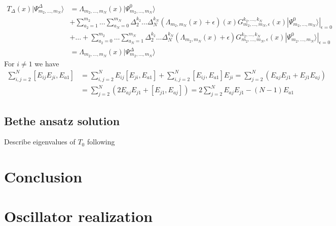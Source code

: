 \documentclass[11pt]{article}
\numberwithin{equation}{section}
\numberwithin{equation}{subsection}
\begin{document}
{\begin{align*}
T_{\Delta}(x)|\Psi_{m_{2},\ldots,m_{N}}^{\Delta}\rangle&=
		\Lambda_{m_{2},\ldots,m_{N}}(x)|\Psi_{m_{2},\ldots,m_{N}}^{0}\rangle
	\\&+
	\sum_{a_{2}=1}^{m_{2}}\ldots\sum_{a_{N}=0}^{m_{N}}\Delta_{2}^{k_{2}}\ldots \Delta_{N}^{k_{N}}\left(\Lambda_{m_{2},m_{N}}(x)+\epsilon\right)(x)G_{m_{2},\ldots,m_{N},\epsilon}^{k_{2},\ldots,k_{N}}(x)|\Psi_{m_{2},\ldots,m_{N}}^{0}\rangle|_{\epsilon=0}
	\\&+\ldots+	\sum_{a_{2}=0}^{m_{2}}\ldots\sum_{a_{N}=1}^{m_{N}}\Delta_{2}^{k_{2}}\ldots \Delta_{N}^{k_{N}}\left(\Lambda_{m_{2},m_{N}}(x)+\epsilon\right)G_{m_{2},\ldots,m_{N},\epsilon}^{k_{2},\ldots,k_{N}}(x)|\Psi_{m_{2},\ldots,m_{N}}^{0}\rangle|_{\epsilon=0}
	\\&=
	\Lambda_{m_{2},\ldots,m_{N}}(x)|\Psi_{m_{2},\ldots,m_{N}}^{\Delta}\rangle
\end{align*}
}
For $i\neq 1$ we have
\begin{equation}
\begin{split}
 \sum_{i,j=2}^N [E_{ij}E_{ji},E_{a1}]&=\sum_{i,j=2}^N E_{ij} [E_{ji},E_{a1}]+\sum_{i,j=2}^N  [E_{ij},E_{a1}]E_{ji}=\sum_{j=2}^N( E_{aj} E_{j1}+ E_{j1} E_{aj})
\\&=\sum_{j=2}^N( 2E_{aj} E_{j1}+ [E_{j1}, E_{aj}])=2\sum_{j=2}^N E_{aj} E_{j1}-(N-1)E_{a1}
 \end{split}
\end{equation} 

\subsection{Bethe ansatz solution}

Describe eigenvalues of $T_0$ following 
\cite{Belliard2} 





\section{Conclusion}








\appendix
\section{Oscillator realization}\label{appA}
\end{document}
